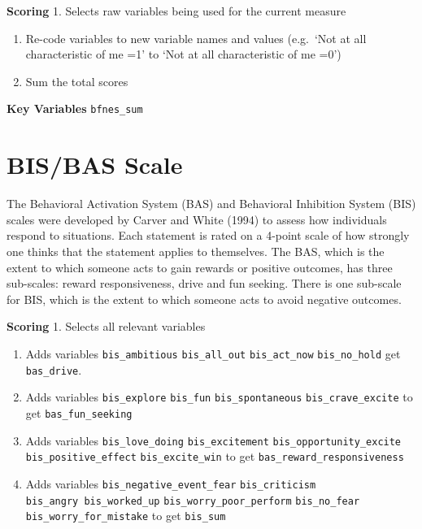 \documentclass[
]{book}
\providecommand{\tightlist}{%
  \setlength{\itemsep}{0pt}\setlength{\parskip}{0pt}}
\begin{document}
\textbf{Scoring} 1. Selects raw variables being used for the current measure

\begin{enumerate}
\def\labelenumi{\arabic{enumi}.}
\setcounter{enumi}{1}
\item
  Re-code variables to new variable names and values (e.g.~`Not at all
  characteristic of me =1' to `Not at all characteristic of me =0')
\item
  Sum the total scores
\end{enumerate}

\textbf{Key Variables} \texttt{bfnes\_sum}

\section{BIS/BAS Scale}\label{bisbas-scale}

The Behavioral Activation System (BAS) and Behavioral Inhibition System
(BIS) scales were developed by Carver and White (1994) to assess how
individuals respond to situations. Each statement is rated on a 4-point
scale of how strongly one thinks that the statement applies to
themselves. The BAS, which is the extent to which someone acts to gain
rewards or positive outcomes, has three sub-scales: reward
responsiveness, drive and fun seeking. There is one sub-scale for BIS,
which is the extent to which someone acts to avoid negative outcomes.

\textbf{Scoring} 1. Selects all relevant variables

\begin{enumerate}
\def\labelenumi{\arabic{enumi}.}
\setcounter{enumi}{1}
\tightlist
\item
  Adds variables \texttt{bis\_ambitious} \texttt{bis\_all\_out} \texttt{bis\_act\_now}
  \texttt{bis\_no\_hold} get \texttt{bas\_drive}.
\item
  Adds variables \texttt{bis\_explore} \texttt{bis\_fun} \texttt{bis\_spontaneous}
  \texttt{bis\_crave\_excite} to get \texttt{bas\_fun\_seeking}
\item
  Adds variables \texttt{bis\_love\_doing} \texttt{bis\_excitement}
  \texttt{bis\_opportunity\_excite} \texttt{bis\_positive\_effect} \texttt{bis\_excite\_win} to
  get \texttt{bas\_reward\_responsiveness}
\item
  Adds variables \texttt{bis\_negative\_event\_fear} \texttt{bis\_criticism}
  \texttt{bis\_angry\ bis\_worked\_up} \texttt{bis\_worry\_poor\_perform} \texttt{bis\_no\_fear}
  \texttt{bis\_worry\_for\_mistake} to get \texttt{bis\_sum}
\end{enumerate}
\end{document}
